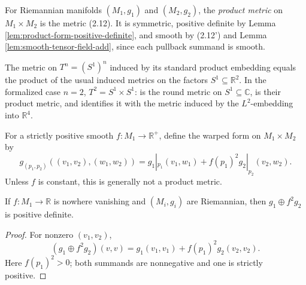 \begin{definition}
\label{def:product-metric}
\leanok
{}
For Riemannian manifolds $(M_1,g_1)$ and $(M_2,g_2)$, the \emph{product metric} on $M_1\times M_2$ is the metric (2.12). It is symmetric, positive definite by Lemma \ref{lem:product-form-positive-definite}, and smooth by (2.12') and Lemma \ref{lem:smooth-tensor-field-add}, since each pullback summand is smooth.
\end{definition}

\begin{proposition}
\label{prop:product-metric-torus}
\leanok
{}
The metric on $T^n=(S^1)^n$ induced by its standard product embedding equals
the product of the usual induced metrics on the factors
$S^1\subseteq\mathbb R^2$. In the formalized case $n=2$,
$T^2=S^1\times S^1$:  is the round metric on
$S^1\subseteq\mathbb C$,  is their product
metric, and  identifies it
with the metric induced by the $L^2$-embedding into $\mathbb R^4$.
\end{proposition}

For a strictly positive smooth $f:M_1\to\mathbb R^+$, define the warped form on $M_1\times M_2$ by
\begin{equation}
g_{(p_1,p_2)}((v_1,v_2),(w_1,w_2))=g_1|_{p_1}(v_1,w_1)+f(p_1)^2g_2|_{p_2}(v_2,w_2).
\end{equation}
Unless $f$ is constant, this is generally not a product metric.

\begin{lemma}
\label{lem:warped-product-form-positive-definite}
\leanok
{}
If $f:M_1\to\mathbb R$ is nowhere vanishing and $(M_i,g_i)$ are Riemannian, then $g_1\oplus f^2g_2$ is positive definite.
\end{lemma}

\begin{proof}
\leanok
{}
\sketch For nonzero $(v_1,v_2)$,
\[
(g_1\oplus f^2g_2)(v,v)=g_1(v_1,v_1)+f(p_1)^2g_2(v_2,v_2).
\]
Here $f(p_1)^2>0$; both summands are nonnegative and one is strictly positive.
\end{proof}

